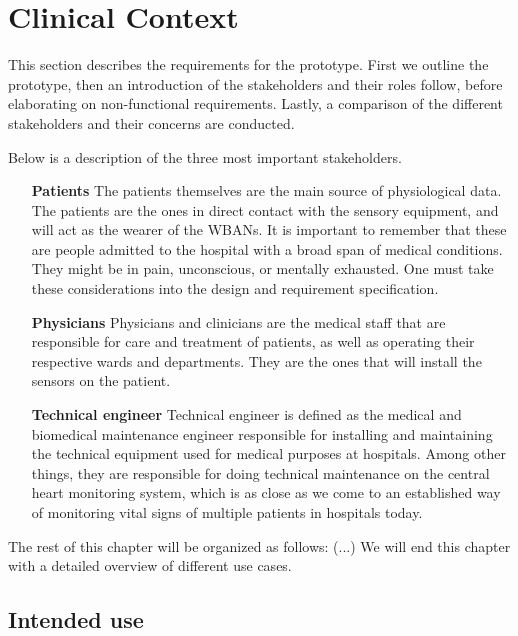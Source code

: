 \section{Clinical Context} %
\label{sec:clinical_context}

This section describes the requirements for the prototype. First we outline the prototype, then an introduction of the stakeholders and their roles follow, before elaborating on non-functional requirements. Lastly, a comparison of the different stakeholders and their concerns are conducted. 

Below is a description of the three most important stakeholders.

\begin{itemize}

  \item[\textbf{Patients}] The patients themselves are the main source of physiological data. The patients are the ones in direct contact with the sensory equipment, and will act as the wearer of the  WBANs. It is important to remember that these are people admitted to the hospital with a broad span of medical conditions. They might be in pain, unconscious, or mentally exhausted. One must take these considerations into the design and requirement specification.

  \item[\textbf{Physicians}] Physicians and clinicians are the medical staff that are responsible for care and treatment of patients, as well as operating their respective wards and departments. They are the ones that will install the sensors on the patient.

  \item[\textbf{Technical engineer}] Technical engineer is defined as the medical and biomedical maintenance engineer responsible for installing and maintaining the technical equipment used for medical purposes at hospitals. Among other things, they are responsible for doing technical maintenance  on the central heart monitoring system, which is as close as we come to an established way of monitoring vital signs of multiple patients in hospitals today.

\end{itemize}

The rest of this chapter will be organized as follows: (...)
We will end this chapter with a detailed overview of different use cases.

\subsection{Intended use} %
\label{sub:intended_use}

